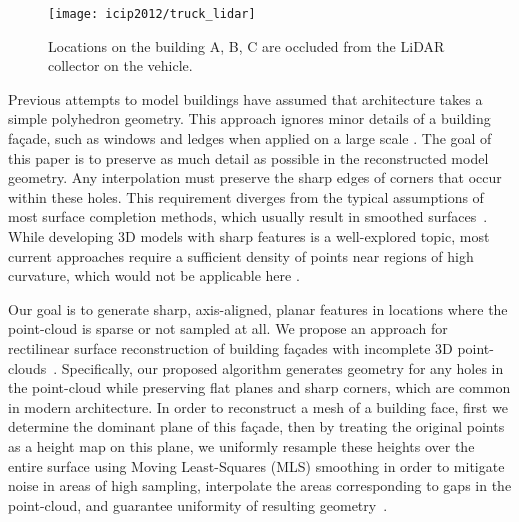 \documentclass[12pt,onecolumn,oneside]{book}
\begin{document}
\begin{figure}[t]

\begin{minipage}[b]{1.0\linewidth}
  \centering
  \centerline{\texttt{[image: icip2012/truck\_lidar]}}
\end{minipage}

\caption[Scanning building fa\c{c}ades from a vehicle.]{Locations on the building A, B, C are occluded from the LiDAR collector on the vehicle.}
\label{fig:truck_lidar}

\end{figure}

Previous attempts to model buildings have assumed that architecture takes a simple polyhedron geometry. This approach ignores minor details of a building fa\c{c}ade, such as windows and ledges when applied on a large scale \cite{Chauve10, Chen07}.  The goal of this paper is to preserve as much detail as possible in the reconstructed model geometry.  Any interpolation must preserve the sharp edges of corners that occur within these holes.  This requirement diverges from the typical assumptions of most surface completion methods, which usually result in smoothed surfaces~\cite{Kazhdan06, Kawai11}.  While developing 3D models with sharp features is a well-explored topic, most current approaches require a sufficient density of points near regions of high curvature, which would not be applicable here \cite{Bernardini04, Mhatre06}.  

Our goal is to generate sharp, axis-aligned, planar features in locations where the point-cloud is sparse or not sampled at all.  We propose an approach for rectilinear surface reconstruction of building fa\c{c}ades with incomplete 3D point-clouds~\cite{Turner12outdoor}.  Specifically, our proposed algorithm generates geometry for any holes in the point-cloud while preserving flat planes and sharp corners, which are common in modern architecture.  In order to reconstruct a mesh of a building face, first we determine the dominant plane of this fa\c{c}ade, then by treating the original points as a height map on this plane, we uniformly resample these heights over the entire surface using Moving Least-Squares (MLS) smoothing in order to mitigate noise in areas of high sampling, interpolate the areas corresponding to gaps in the point-cloud, and guarantee uniformity of resulting geometry~\cite{Nealen04}.
\end{document}
